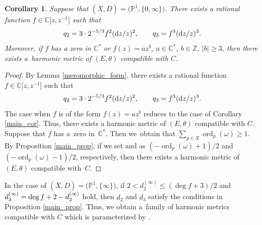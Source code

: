 \documentclass[10pt,a4paper]{amsart}
\numberwithin{equation}{section}
\newtheorem{Corollary}[Theorem]{Corollary}
\newcommand{\C}{\mathbb{C}}
\newcommand{\Z}{\mathbb{Z}}
\newcommand{\ps}{\mathbb{P}}
\newcommand{\ord}{\operatorname{ord}}
\begin{document}
\begin{Corollary}\label{main_Cstar_cor}
 Suppose that $(\overline{X},D) = \bigl(\ps^1,\{0,\infty\}\bigr)$. There exists a rational function $f\in \C\bigl[z,z^{-1}\bigr]$ such that
 \begin{equation*}
 q_2 = 3\cdot 2^{-5/3}f^2 ({\rm d}z/z)^2, \qquad q_3 = f^3 ({\rm d}z/z)^3.
 \end{equation*}
 Moreover, if $f$ has a zero in $\C^*$ or $f(z)=a z^b$, $a\in\C^*$, $b\in\Z$, $|b|\geq 3$, then there exists a~harmonic metric of $(E,\theta)$ compatible with $C$.
\end{Corollary}

\begin{proof}
 By Lemma \ref{meromorphic_form}, there exists a rational function $f\in \C\bigl[z,z^{-1}\bigr]$ such that
 \begin{equation*}
 q_2 = 3\cdot 2^{-5/3}f^2 ({\rm d}z/z)^2, \qquad q_3 = f^3 ({\rm d}z/z)^3.
 \end{equation*}
 The case when $f$ is of the form $f(z)=az^b$ reduces to the case of Corollary \ref{main_cor}. Thus, there exists a harmonic metric of $(E,\theta)$ compatible with $C$. Suppose that $f$ has a~zero in~$\C^*$. Then we~obtain that $\sum_{p\in X}\ord_p(\omega)\geq 1$. By Proposition \ref{main_prop}, if we set  and  as $(-\ord_{p}(\omega)+1)/2$ and $(-\ord_{p}(\omega)-1)/2$, respectively, then there exists a harmonic metric of $(E,\theta)$ compatible with~$C$.
\end{proof}

\begin{Remark}\label{condition_of_d_2}
 In the case of $(\overline{X},D)=\bigl(\ps^1,\{\infty\}\bigr)$, if $2< d_2^{(\infty)} \leq (\deg{f} + 3 )/2$ and $d_3^{(\infty)} = \smash{\deg{f} +2 - d_2^{(\infty)}}$ hold, then $d_2$ and $d_3$ satisfy the conditions in Proposition \ref{main_prop}. Thus, we obtain a~family of harmonic metrics compatible with $C$ which is parameterized by .
\end{Remark}
\end{document}
